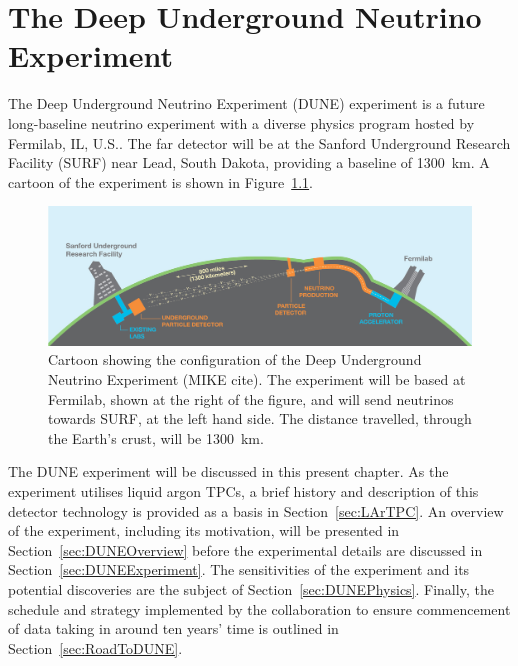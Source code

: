 
\graphicspath{{DUNE/Figs/}}

\chapter{The Deep Underground Neutrino Experiment}\label{chap:DUNE}

The Deep Underground Neutrino Experiment (DUNE) experiment \cite{DUNECDR1,DUNECDR2,DUNECDR3,DUNECDR4} is a future long-baseline neutrino experiment with a diverse physics program hosted by Fermilab, IL, U.S..  The far detector will be at the Sanford Underground Research Facility (SURF) near Lead, South Dakota, providing a baseline of 1300~km.  A cartoon of the experiment is shown in Figure~\ref{fig:DUNE}.

\begin{figure}
  \centering
  \includegraphics[width=14cm]{DUNE.jpg}
  \caption[Cartoon showing the configuration of the Deep Underground Neutrino Experiment.]{Cartoon showing the configuration of the Deep Underground Neutrino Experiment (MIKE cite).  The experiment will be based at Fermilab, shown at the right of the figure, and will send neutrinos towards SURF, at the left hand side.  The distance travelled, through the Earth's crust, will be 1300~km.}
  \label{fig:DUNE}
\end{figure}

The DUNE experiment will be discussed in this present chapter.  As the experiment utilises liquid argon TPCs, a brief history and description of this detector technology is provided as a basis in Section~\ref{sec:LArTPC}.  An overview of the experiment, including its motivation, will be presented in Section~\ref{sec:DUNEOverview} before the experimental details are discussed in Section~\ref{sec:DUNEExperiment}.  The sensitivities of the experiment and its potential discoveries are the subject of Section~\ref{sec:DUNEPhysics}.  Finally, the schedule and strategy implemented by the collaboration to ensure commencement of data taking in around ten years' time is outlined in Section~\ref{sec:RoadToDUNE}.

